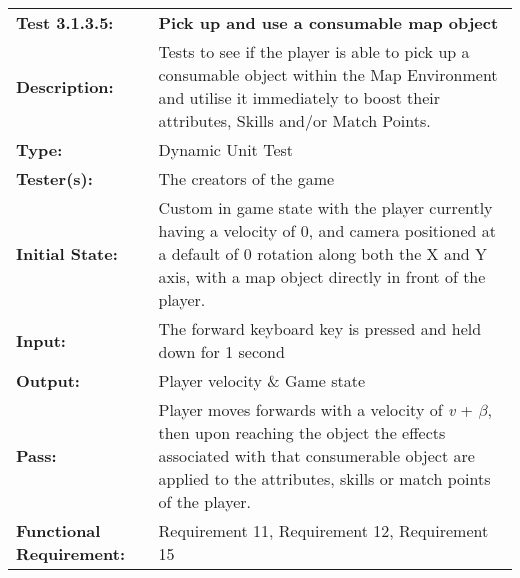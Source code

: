 \documentclass[12pt, titlepage]{article}
\begin{document}
\begin{mdframed}[linewidth=1pt]
\begin{tabularx}{\textwidth}{@{}p{3cm}X@{}}
{\bf Test 3.1.3.5:} & {\bf Pick up and use a consumable map object}\\[\baselineskip]
{\bf Description:} & Tests to see if the player is able to pick up a consumable object within the Map Environment and utilise it immediately to boost their attributes, Skills and/or Match Points.\\[0.5\baselineskip]
{\bf Type:} & Dynamic Unit Test\\[0.5\baselineskip]
{\bf Tester(s):} & The creators of the game\\[0.5\baselineskip]
{\bf Initial State:} & Custom in game state with the player currently having a velocity of 0, and camera positioned at a default of 0 rotation along both the X and Y axis, with a map object  directly in front of the player.\\[0.5\baselineskip]
{\bf Input:} & The forward keyboard key is pressed and held down for 1 second \\[0.5\baselineskip]
{\bf Output:} & Player velocity \& Game state\\[0.5\baselineskip]
{\bf Pass:} & Player moves forwards with a velocity of \textit{v} + $\beta$, then upon reaching the object the effects associated with that consumerable object are applied to the attributes, skills or match points of the player.  \\[0.5\baselineskip]
{\bf Functional Requirement:} & Requirement 11, Requirement 12, Requirement 15
\end{tabularx}
\end{mdframed}
\end{document}
